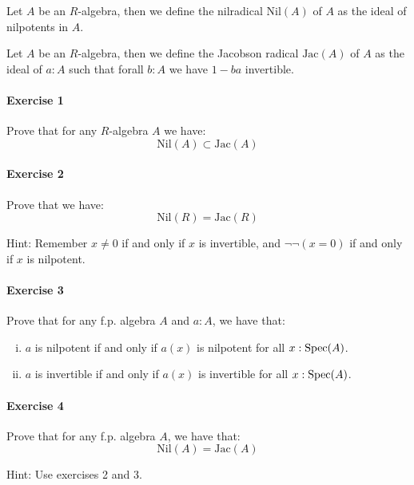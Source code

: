 \begin{definition}
Let $A$ be an $R$-algebra, then we define the nilradical $\mathrm{Nil}(A)$ of $A$ as the ideal of nilpotents in $A$.
\end{definition}

\begin{definition}
Let $A$ be an $R$-algebra, then we define the Jacobson radical $\mathrm{Jac}(A)$ of $A$ as the ideal of $a:A$ such that forall $b:A$ we have $1-ba$ invertible.
\end{definition}

\paragraph{Exercise 1}{
Prove that for any $R$-algebra $A$ we have:
\[\mathrm{Nil}(A) \subset \mathrm{Jac}(A)\]
}

\paragraph{Exercise 2}{
Prove that we have:
\[\mathrm{Nil}(R) = \mathrm{Jac}(R)\]
}

Hint: Remember $x\not=0$ if and only if $x$ is invertible, and $\neg\neg(x=0)$ if and only if $x$ is nilpotent. 

\paragraph{Exercise 3}{
Prove that for any f.p. algebra $A$ and $a:A$, we have that:

\begin{enumerate}[(i)]
\item $a$ is nilpotent if and only if $a(x)$ is nilpotent for all $x:\operatorname{Spec}(A)$.
\item $a$ is invertible if and only if $a(x)$ is invertible for all $x:\operatorname{Spec}(A)$.
\end{enumerate}
}

\paragraph{Exercise 4}{
Prove that for any f.p. algebra $A$, we have that:
\[\mathrm{Nil}(A) = \mathrm{Jac}(A)\]
}

Hint: Use exercises 2 and 3.